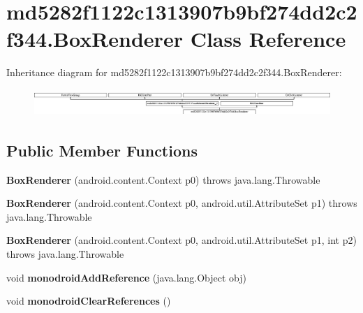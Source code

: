 \hypertarget{classmd5282f1122c1313907b9bf274dd2c2f344_1_1BoxRenderer}{}\section{md5282f1122c1313907b9bf274dd2c2f344.\+Box\+Renderer Class Reference}
\label{classmd5282f1122c1313907b9bf274dd2c2f344_1_1BoxRenderer}
Inheritance diagram for md5282f1122c1313907b9bf274dd2c2f344.\+Box\+Renderer\+:\begin{figure}[H]
\begin{center}
\leavevmode
\includegraphics[height=1.029412cm]{classmd5282f1122c1313907b9bf274dd2c2f344_1_1BoxRenderer}
\end{center}
\end{figure}
\subsection*{Public Member Functions}
\begin{DoxyCompactItemize}
\item 
\hypertarget{classmd5282f1122c1313907b9bf274dd2c2f344_1_1BoxRenderer_a3fd95cd64021f9c965f1565722aae3a9}{}{\bfseries Box\+Renderer} (android.\+content.\+Context p0)  throws java.\+lang.\+Throwable 	\label{classmd5282f1122c1313907b9bf274dd2c2f344_1_1BoxRenderer_a3fd95cd64021f9c965f1565722aae3a9}

\item 
\hypertarget{classmd5282f1122c1313907b9bf274dd2c2f344_1_1BoxRenderer_a200c979bd661a9854ab82eebc2ff6859}{}{\bfseries Box\+Renderer} (android.\+content.\+Context p0, android.\+util.\+Attribute\+Set p1)  throws java.\+lang.\+Throwable 	\label{classmd5282f1122c1313907b9bf274dd2c2f344_1_1BoxRenderer_a200c979bd661a9854ab82eebc2ff6859}

\item 
\hypertarget{classmd5282f1122c1313907b9bf274dd2c2f344_1_1BoxRenderer_a01da643484ea8124917a3bd2e302d8a8}{}{\bfseries Box\+Renderer} (android.\+content.\+Context p0, android.\+util.\+Attribute\+Set p1, int p2)  throws java.\+lang.\+Throwable 	\label{classmd5282f1122c1313907b9bf274dd2c2f344_1_1BoxRenderer_a01da643484ea8124917a3bd2e302d8a8}

\item 
\hypertarget{classmd5282f1122c1313907b9bf274dd2c2f344_1_1BoxRenderer_affd3b6fedeffffbe7b41d789d1721f4b}{}void {\bfseries monodroid\+Add\+Reference} (java.\+lang.\+Object obj)\label{classmd5282f1122c1313907b9bf274dd2c2f344_1_1BoxRenderer_affd3b6fedeffffbe7b41d789d1721f4b}

\item 
\hypertarget{classmd5282f1122c1313907b9bf274dd2c2f344_1_1BoxRenderer_a57078f3d90778fc37c52abdfbe2b56ec}{}void {\bfseries monodroid\+Clear\+References} ()\label{classmd5282f1122c1313907b9bf274dd2c2f344_1_1BoxRenderer_a57078f3d90778fc37c52abdfbe2b56ec}

\end{DoxyCompactItemize}


